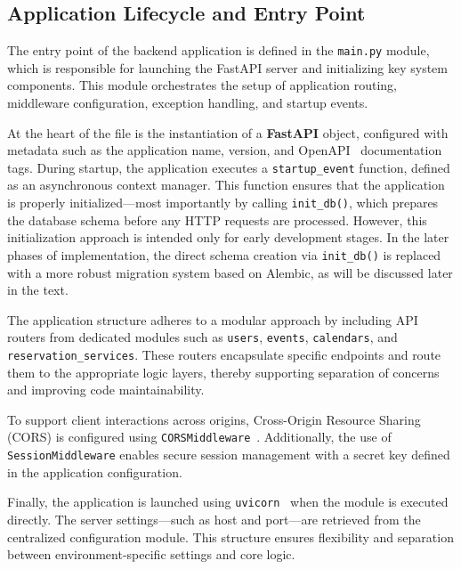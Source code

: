 \subsection{Application Lifecycle and Entry Point}

The entry point of the backend application is defined in the \texttt{main.py} module, which is responsible for launching the FastAPI server and initializing key system components. This module orchestrates the setup of application routing, middleware configuration, exception handling, and startup events.

At the heart of the file is the instantiation of a \textbf{FastAPI} object, configured with metadata such as the application name, version, and OpenAPI~\cite{OpenAPI} documentation tags. During startup, the application executes a \texttt{startup\_event} function, defined as an asynchronous context manager. This function ensures that the application is properly initialized—most importantly by calling \texttt{init\_db()}, which prepares the database schema before any HTTP requests are processed. However, this initialization approach is intended only for early development stages. In the later phases of implementation, the direct schema creation via \texttt{init\_db()} is replaced with a more robust migration system based on Alembic, as will be discussed later in the text.

The application structure adheres to a modular approach by including API routers from dedicated modules such as \texttt{users}, \texttt{events}, \texttt{calendars}, and \texttt{reservation\_services}. These routers encapsulate specific endpoints and route them to the appropriate logic layers, thereby supporting separation of concerns and improving code maintainability.

To support client interactions across origins, Cross-Origin Resource Sharing (CORS) is configured using \texttt{CORSMiddleware}~\cite{CORS}. Additionally, the use of \texttt{SessionMiddleware} enables secure session management with a secret key defined in the application configuration.

Finally, the application is launched using \texttt{uvicorn}~\cite{Uvicorn} when the module is executed directly. The server settings—such as host and port—are retrieved from the centralized configuration module. This structure ensures flexibility and separation between environment-specific settings and core logic.

